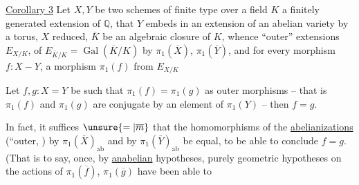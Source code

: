 \uline{Corollary 3} Let  $X,Y$ be two schemes of finite type over a field $K$ a finitely generated extension of $\mathbb Q$,   that $Y$ embeds in an  extension of an abelian variety by a torus, $X$ reduced,   $\overline K$ be an algebraic closure of $K$, whence ``outer'' extensions $E_{X/K}$,  of $E_{\overline K/K}=\operatorname{Gal}(\overline K/K)$ by $\pi_1(\overline X)$, $\pi_1(\overline Y)$, and for every morphism $f:X-Y$, a morphism $\pi_1(f)$ from $E_{X/K}$ 

Let $f,g:X=Y$ be such that $\pi_1(f)=\pi_1(g)$ as outer morphisms -- that is $\pi_1(f)$ and $\pi_1(g)$ are conjugate by an element of $\pi_1(Y)$ -- then $f=g$.

In fact, it suffices $\unsure{=|\overline m}$ that the homomorphisms of the \uline{abelianizations} (``outer, ) by $\pi_1(\overline X)_{\mathrm{ab}}$ and by $\pi_1(\overline Y)_{\mathrm{ab}}$ be equal, to be able to conclude $f=g$. (That is to say, once,  by \uline{anabelian} hypotheses, purely geometric hypotheses on the actions of $\pi_1(\overline f)$, $\pi_1(\overline g)$ have been able to 
